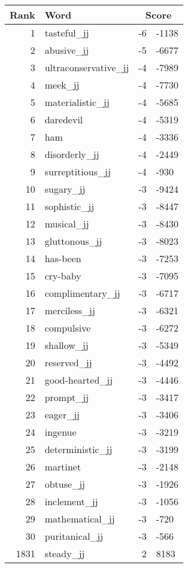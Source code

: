 \begin{longtable}[!htbp]{| rlr@{.}l |}
    \hline
    \textbf{Rank} & \textbf{Word} & \multicolumn{2}{c|}{\textbf{Score}} \\
    \hline
    \endhead
    1 & tasteful\_jj & -6 & -1138 \\
    2 & abusive\_jj & -5 & -6677 \\
    3 & ultraconservative\_jj & -4 & -7989 \\
    4 & meek\_jj & -4 & -7730 \\
    5 & materialistic\_jj & -4 & -5685 \\
    6 & daredevil & -4 & -5319 \\
    7 & ham & -4 & -3336 \\
    8 & disorderly\_jj & -4 & -2449 \\
    9 & surreptitious\_jj & -4 & -930 \\
    10 & sugary\_jj & -3 & -9424 \\
    11 & sophistic\_jj & -3 & -8447 \\
    12 & musical\_jj & -3 & -8430 \\
    13 & gluttonous\_jj & -3 & -8023 \\
    14 & has-been & -3 & -7253 \\
    15 & cry-baby & -3 & -7095 \\
    16 & complimentary\_jj & -3 & -6717 \\
    17 & merciless\_jj & -3 & -6321 \\
    18 & compulsive & -3 & -6272 \\
    19 & shallow\_jj & -3 & -5349 \\
    20 & reserved\_jj & -3 & -4492 \\
    21 & good-hearted\_jj & -3 & -4446 \\
    22 & prompt\_jj & -3 & -3417 \\
    23 & eager\_jj & -3 & -3406 \\
    24 & ingenue & -3 & -3219 \\
    25 & deterministic\_jj & -3 & -3199 \\
    26 & martinet & -3 & -2148 \\
    27 & obtuse\_jj & -3 & -1926 \\
    28 & inclement\_jj & -3 & -1056 \\
    29 & mathematical\_jj & -3 & -720 \\
    30 & puritanical\_jj & -3 & -566 \\
    1831 & steady\_jj & 2 & 8183 \\

\end{longtable}
